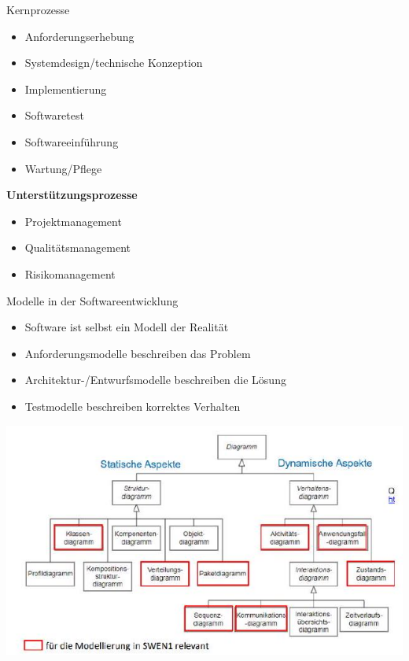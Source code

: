 \begin{corollary}{Kernprozesse}

\begin{minipage}[t]{0.6\textwidth}
\begin{itemize}
  \item Anforderungserhebung
  \item Systemdesign/technische Konzeption
  \item Implementierung
  \item Softwaretest
  \item Softwareeinführung
  \item Wartung/Pflege
\end{itemize}
\end{minipage}
\begin{minipage}[t]{0.38\textwidth}
\textbf{\textcolor{frog}{Unterstützungsprozesse}}
\begin{itemize}
  \item Projektmanagement
  \item Qualitätsmanagement
  \item Risikomanagement 
\end{itemize}
\end{minipage}
\end{corollary}

\begin{concept}{Modelle in der Softwareentwicklung} 
\begin{itemize}
    \item Software ist selbst ein Modell der Realität
    \item Anforderungsmodelle beschreiben das Problem
    \item Architektur-/Entwurfsmodelle beschreiben die Lösung
    \item Testmodelle beschreiben korrektes Verhalten
\end{itemize}
\includegraphics[width=\linewidth]{images/2024_12_29_0d1d7b5551ea1b4b41bdg-01(1)}
\end{concept}


